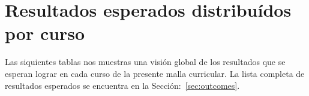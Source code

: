 \section{Resultados esperados distribuí­dos por curso}\label{sec:outcomes-by-course}
Las siquientes tablas nos muestras una visión global de los resultados que se esperan lograr en cada 
curso de la presente malla curricular. 
La lista completa de resultados esperados se encuentra en la Sección:~\ref{sec:outcomes}.
